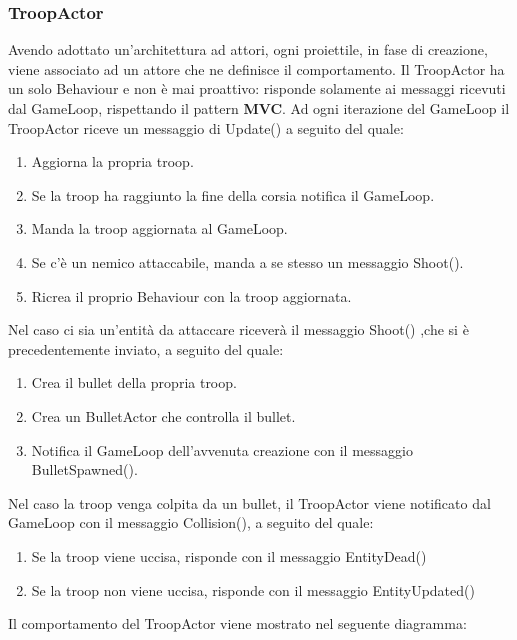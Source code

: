 \subsubsection{TroopActor}
Avendo adottato un'architettura ad attori, ogni proiettile, in fase di creazione, viene associato ad un attore che ne definisce il comportamento.
Il TroopActor ha un solo Behaviour e non è mai proattivo: risponde solamente ai messaggi ricevuti dal GameLoop, rispettando
il pattern \textbf{MVC}.
Ad ogni iterazione del GameLoop il TroopActor riceve un messaggio di Update() a seguito del quale:
\begin{enumerate}
    \item Aggiorna la propria troop.
    \item Se la troop ha raggiunto la fine della corsia notifica il GameLoop.
    \item Manda la troop aggiornata al GameLoop.
    \item Se c'è un nemico attaccabile, manda a se stesso un messaggio Shoot().
    \item Ricrea il proprio Behaviour con la troop aggiornata.
\end{enumerate}
Nel caso ci sia un'entità da attaccare riceverà il messaggio Shoot() ,che si è precedentemente inviato, a seguito del quale:
\begin{enumerate}
    \item Crea il bullet della propria troop.
    \item Crea un BulletActor che controlla il bullet.
    \item Notifica il GameLoop dell'avvenuta creazione con il messaggio BulletSpawned().
\end{enumerate}
Nel caso la troop venga colpita da un bullet, il TroopActor viene notificato dal GameLoop con il messaggio Collision(),
a seguito del quale:
\begin{enumerate}
    \item Se la troop viene uccisa, risponde con il messaggio EntityDead()
    \item Se la troop non viene uccisa, risponde con il messaggio EntityUpdated()
\end{enumerate}
Il comportamento del TroopActor viene mostrato nel seguente diagramma:

